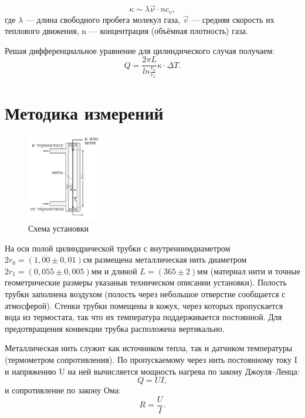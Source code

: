 \documentclass[a4paper, 12pt]{article}
\begin{document}
\begin{equation}\label{2}
	\kappa \sim \lambda \vec{\nu} \cdot n c_v,
\end{equation}
где $\lambda$  — длина свободного пробега молекул газа, $\vec{v}$ — средняя скорость их теплового движения, n — концентрация (объёмная плотность) газа.

Решая дифференциальное уравнение для цилиндического случая получаем:
\begin{equation}\label{3}
	Q = \frac{2\pi L}{ln\frac{r_0}{r_1}} \kappa \cdot \Delta T.
\end{equation}

\section{Методика измерений}

\begin{figure}
\includegraphics[width=0.3\textwidth]{1.png}
\caption{Схема установки}
\label{ris1}
\end{figure}

На оси полой цилиндрической трубки с внутреннимдиаметром $2r_0=(1,00\pm0,01)см$ размещена металлическая нить диаметром $2r_1=(0,055\pm0,005)мм$ и длиной $L=(365\pm2)мм$ (материал нити и точные геометрические размеры указаныв техническом описании установки). Полость трубки заполнена воздухом (полость через небольшое отверстие сообщается с атмосферой). Стенки трубки помещены в кожух, через которых пропускается вода из термостата, так что их температура поддерживается постоянной. Для предотвращения конвекции трубка  расположена вертикально.

Металлическая нить служит как источником тепла, так и датчиком температуры (термометром сопротивления). По пропускаемому через нить постоянному току I и напряжению U на ней вычисляется мощность нагрева по закону Джоуля–Ленца:
\begin{equation}\label{4}
	Q = UI,
\end{equation}
и сопротивление по закону Ома:
\begin{equation}\label{5}
	R = \frac{U}{I}.
\end{equation}
\end{document}
